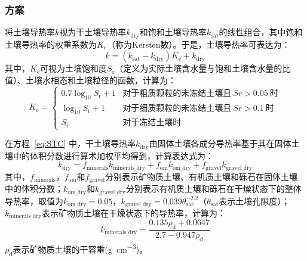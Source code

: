\subsubsection{\citet{Johansen1975}方案}
\citet{Johansen1975}将土壤导热率$k$视为干土壤导热率$k_{\mathrm{dry}}$和饱和土壤导热率$k_{\mathrm{sat}}$的线性组合，其中饱和土壤导热率的权重系数为$K_{\mathrm {e}} $（称为Kersten数）。于是，土壤导热率可表达为：
\begin{equation}\label{eq:STC}
  k=(k_{\mathrm{sat}}-k_{\mathrm{dry}})K_{\mathrm {e}} +k_{\mathrm{dry}}
\end{equation}
其中，$K_{\mathrm {e}} $可视为土壤饱和度$S_{\mathrm {r}} $（定义为实际土壤含水量与饱和土壤含水量的比值）、土壤水相态和土壤粒径的函数，计算为：
\begin{equation}
  K_{\mathrm {e}} =\begin{cases}
    0.7\log_{10}S_{\mathrm {r}} +1 & \text {对于粗质颗粒的未冻结土壤且}\ Sr>0.05\ \text {时} \\
    \log_{10}S_{\mathrm {r}} +1 & \text {对于细质颗粒的未冻结土壤且}\ Sr>0.1\ \text {时} \\
    S_{\mathrm {r}}  & \text {对于冻结土壤时}
  \end{cases}
\end{equation}

在方程~\eqref{eq:STC} 中，干土壤导热率$k_{\mathrm{dry}}$由固体土壤各成分导热率基于其在固体土壤中的体积分数进行算术加权平均得到，计算表达式为：
\begin{equation}\label{eq:STC_dry}
  k_{\mathrm{dry}}=f_{\mathrm{minerals}}k_{\mathrm{minerals\_dry}}+f_{\mathrm{om}}k_{\mathrm{om\_dry}}+f_{\mathrm{gravel}}k_{\mathrm{gravel\_dry}}
\end{equation}
其中，$f_{\mathrm{minerals}}$，$f_{\mathrm{om}}$和$f_{\mathrm{gravel}}$分别表示矿物质土壤、有机质土壤和砾石在固体土壤中的体积分数；$k_{\mathrm{om\_dry}}$和$k_{\mathrm{gravel\_dry}}$分别表示有机质土壤和砾石在干燥状态下的整体导热率，取值为$k_{\mathrm{om\_dry}}=0.05$，$k_{\mathrm{gravel\_dry}}=0.039\theta_{\mathrm {sat}} ^{-2.2}$（$\theta_{\mathrm {sat}} $表示土壤孔隙度）；$k_{\mathrm{minerals\_dry}}$表示矿物质土壤在干燥状态下的导热率，计算为：$$k_{\mathrm{minerals\_dry}}=\frac{0.135\rho_{\mathrm {d}} +0.0647}{2.7-0.947\rho_{\mathrm {d}} }$$
$\rho_{\mathrm {d}} $表示矿物质土壤的干容重(\unit{g.cm^{-3}})。

